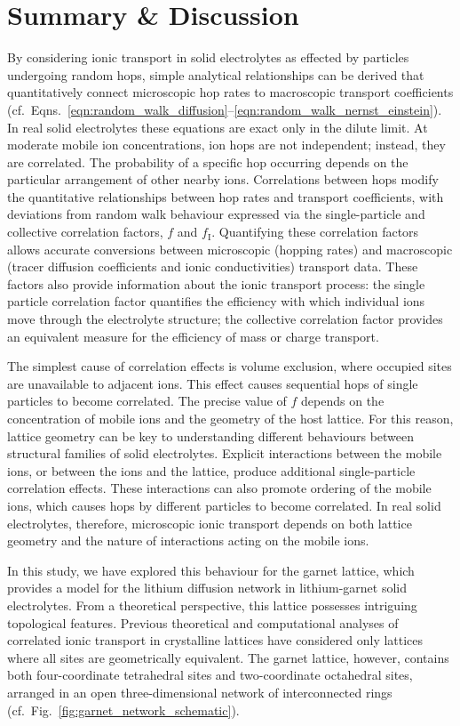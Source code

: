 \documentclass[aps,prb,twocolumn,superscriptaddress,reprint]{revtex4-1}
\newcommand{\m}[1]{\mathrm{#1}}
\begin{document}
\section{Summary \& Discussion}

By considering ionic transport in solid electrolytes as effected by particles undergoing random hops, simple analytical relationships can be derived that quantitatively connect microscopic hop rates to macroscopic transport coefficients (cf.\ Eqns.~\ref{eqn:random_walk_diffusion}--\ref{eqn:random_walk_nernst_einstein}). In real solid electrolytes these equations are exact only in the dilute limit. At moderate mobile ion concentrations, ion hops are not independent; instead, they are correlated. The probability of a specific hop occurring depends on the particular arrangement of other nearby ions. Correlations between hops modify the quantitative relationships between hop rates and transport coefficients, with deviations from random walk behaviour expressed via the single-particle and collective correlation factors, $f$ and $f_\m{I}$. Quantifying these correlation factors allows accurate conversions between microscopic (hopping rates) and macroscopic (tracer diffusion coefficients and ionic conductivities) transport data. These factors also provide information about the ionic transport process: the single particle correlation factor quantifies the efficiency with which individual ions move through the electrolyte structure; the collective correlation factor provides an equivalent measure for the efficiency of mass or charge transport.

The simplest cause of correlation effects is volume exclusion, where occupied sites are unavailable to adjacent ions. This effect causes sequential hops of single particles to become correlated. The precise value of $f$ depends on the concentration of mobile ions and the geometry of the host lattice. For this reason, lattice geometry can be key to understanding different behaviours between structural families of solid electrolytes. Explicit interactions between the mobile ions, or between the ions and the lattice, produce additional single-particle correlation effects. These interactions can also promote ordering of the mobile ions, which causes hops by different particles to become correlated. In real solid electrolytes, therefore, microscopic ionic transport depends on both lattice geometry and the nature of interactions acting on the mobile ions.

In this study, we have explored this behaviour for the garnet lattice, which provides a model for the lithium diffusion network in lithium-garnet solid electrolytes. From a theoretical perspective, this lattice possesses intriguing topological features. Previous theoretical and computational analyses of correlated ionic transport in crystalline lattices have considered only lattices where all sites are geometrically equivalent. The garnet lattice, however, contains both four-coordinate tetrahedral sites and two-coordinate octahedral sites, arranged in an open three-dimensional network of interconnected rings (cf.\ Fig.~\ref{fig:garnet_network_schematic}). 
\end{document}

